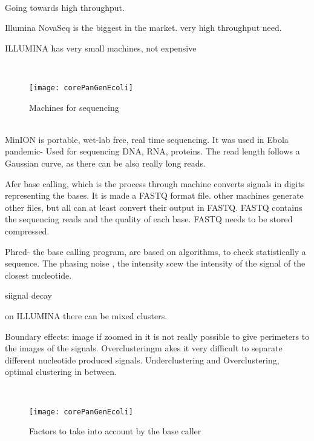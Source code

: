 \\

Going towards high throughput. 


Illumina NovaSeq is the biggest in the market. very high throughput need.


ILLUMINA has very small machines,  not expensive


\\

\begin{figure}[h]
\caption{Machines for sequencing}\label{balancepancore}
\centering
\texttt{[image: corePanGenEcoli]}
\end{figure}

\\

MinION is portable, wet-lab free, real time sequencing. It was used in Ebola pandemic- Used for sequencing DNA, RNA, proteins. The read length follows a Gaussian curve, as there can be also really long reads. 


Afer base calling, which is the process through machine converts signals in digits representing the bases. It is made a FASTQ format file. other machines generate other files, but all can at least convert their output in FASTQ. FASTQ contains the sequencing reads and the quality of each base. FASTQ needs to be stored compressed. 

Phred- the base calling program, are based on algorithms, to check statistically a sequence. 
The phasing noise \phi, the intensity scew the intensity of the signal of the closest nucleotide. 

siignal decay \delta

on ILLUMINA there can be mixed clusters. 

Boundary effects: image if zoomed in  it is not really possible to give perimeters to the images of the signals. Overclusteringm akes it very difficult to separate different nucleotide produced signals. Underclustering and Overclustering, optimal clustering in between. 


\\

\begin{figure}[h]
\caption{Factors to take into account by the base caller}\label{balancepancore}
\centering
\texttt{[image: corePanGenEcoli]}
\end{figure}

\\

\\

